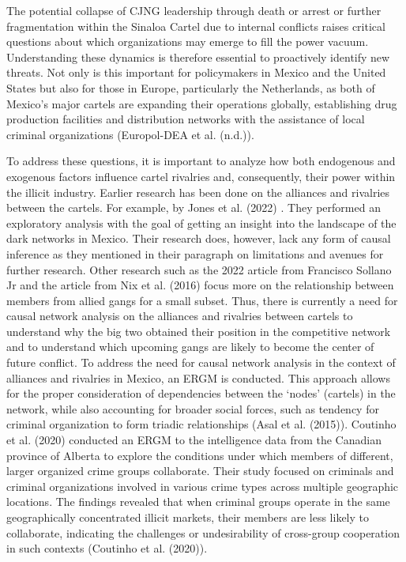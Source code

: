 \documentclass[
]{article}
\begin{document}
The potential collapse of CJNG leadership through death or arrest or
further fragmentation within the Sinaloa Cartel due to internal
conflicts raises critical questions about which organizations may emerge
to fill the power vacuum. Understanding these dynamics is therefore
essential to proactively identify new threats. Not only is this
important for policymakers in Mexico and the United States but also for
those in Europe, particularly the Netherlands, as both of Mexico's major
cartels are expanding their operations globally, establishing drug
production facilities and distribution networks with the assistance of
local criminal organizations (Europol-DEA et al. (n.d.)).

To address these questions, it is important to analyze how both
endogenous and exogenous factors influence cartel rivalries and,
consequently, their power within the illicit industry. Earlier research
has been done on the alliances and rivalries between the cartels. For
example, by Jones et al. (2022) . They performed an exploratory analysis
with the goal of getting an insight into the landscape of the dark
networks in Mexico. Their research does, however, lack any form of
causal inference as they mentioned in their paragraph on limitations and
avenues for further research. Other research such as the 2022 article
from Francisco Sollano Jr and the article from Nix et al. (2016) focus
more on the relationship between members from allied gangs for a small
subset. Thus, there is currently a need for causal network analysis on
the alliances and rivalries between cartels to understand why the big
two obtained their position in the competitive network and to understand
which upcoming gangs are likely to become the center of future conflict.
To address the need for causal network analysis in the context of
alliances and rivalries in Mexico, an ERGM is conducted. This approach
allows for the proper consideration of dependencies between the `nodes'
(cartels) in the network, while also accounting for broader social
forces, such as tendency for criminal organization to form triadic
relationships (Asal et al. (2015)). Coutinho et al. (2020) conducted an
ERGM to the intelligence data from the Canadian province of Alberta to
explore the conditions under which members of different, larger
organized crime groups collaborate. Their study focused on criminals and
criminal organizations involved in various crime types across multiple
geographic locations. The findings revealed that when criminal groups
operate in the same geographically concentrated illicit markets, their
members are less likely to collaborate, indicating the challenges or
undesirability of cross-group cooperation in such contexts (Coutinho et
al. (2020)).
\end{document}
